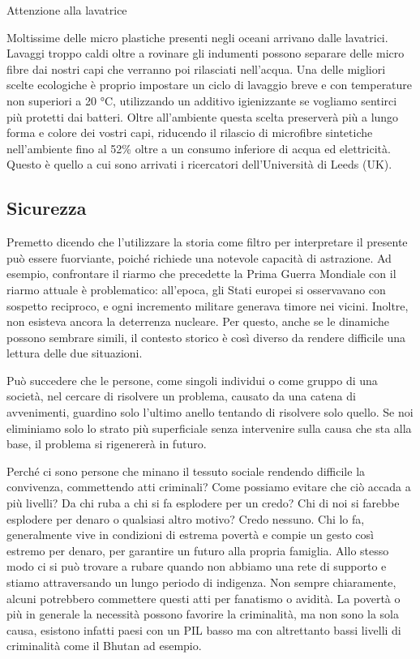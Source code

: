 \documentclass[12pt]{book} %
\begin{document}
\begin{mdframed}[linewidth=1pt]
Attenzione alla lavatrice

Moltissime delle micro plastiche presenti negli oceani arrivano dalle lavatrici. Lavaggi troppo caldi oltre a rovinare
gli indumenti possono separare delle micro fibre dai nostri capi che verranno poi rilasciati
nell'acqua. Una delle migliori scelte ecologiche è proprio impostare un ciclo di lavaggio breve e
con temperature non superiori a 20 °C, utilizzando un additivo igienizzante se vogliamo sentirci più protetti dai
batteri. Oltre all'ambiente questa scelta preserverà più a lungo forma e colore dei vostri capi,
riducendo il rilascio di microfibre sintetiche nell'ambiente fino al 52\% oltre a un consumo inferiore di acqua ed
elettricità. Questo è quello a cui sono arrivati i ricercatori dell'Università di Leeds
(UK).
\end{mdframed}

\subsection{Sicurezza}
Premetto dicendo che l'utilizzare la storia come filtro per interpretare il presente può essere fuorviante, poiché richiede una notevole capacità di astrazione. Ad esempio, confrontare il riarmo che precedette la Prima Guerra Mondiale con il riarmo attuale è problematico: all’epoca, gli Stati europei si osservavano con sospetto reciproco, e ogni incremento militare generava timore nei vicini. Inoltre, non esisteva ancora la deterrenza nucleare. Per questo, anche se le dinamiche possono sembrare simili, il contesto storico è così diverso da rendere difficile una lettura delle due situazioni. 

Può succedere che le persone, come singoli individui o come gruppo di una società, nel cercare
di risolvere un problema, causato da una catena di avvenimenti, guardino solo l'ultimo anello
tentando di risolvere solo quello. Se noi eliminiamo solo lo strato più superficiale senza intervenire sulla
causa che sta alla base, il problema si rigenererà in futuro.

Perché ci sono persone che minano il tessuto sociale rendendo difficile la convivenza, commettendo atti criminali?
Come possiamo evitare che ciò accada a più livelli? Da chi ruba a chi si fa esplodere per un credo?
Chi di noi si farebbe esplodere per denaro o qualsiasi altro motivo? Credo nessuno.
Chi lo fa, generalmente vive in condizioni di estrema povertà e compie un gesto così estremo per denaro, per garantire un futuro alla propria famiglia.
Allo stesso modo ci si può trovare a rubare quando non abbiamo una rete di supporto e stiamo attraversando un lungo periodo di indigenza.
Non sempre chiaramente, alcuni potrebbero commettere questi atti per fanatismo o avidità.
La povertà o più in generale la necessità possono favorire la criminalità, ma non sono la sola causa, esistono infatti paesi con un PIL basso ma con altrettanto bassi livelli di criminalità come il Bhutan ad esempio.
\end{document}
